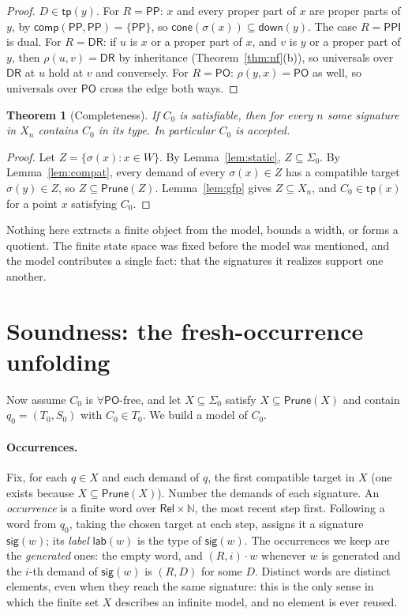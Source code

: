 \documentclass[11pt]{article}
\newcommand{\DR}{\mathsf{DR}}
\newcommand{\PO}{\mathsf{PO}}
\newcommand{\PP}{\mathsf{PP}}
\newcommand{\PPI}{\mathsf{PPI}}
\newcommand{\Rel}{\mathsf{Rel}}
\newcommand{\comp}{\mathsf{comp}}
\newcommand{\tp}{\mathsf{tp}}
\newcommand{\dn}{\mathsf{down}}
\newcommand{\cone}{\mathsf{cone}}
\newcommand{\Prune}{\mathsf{Prune}}
\newcommand{\lab}{\mathsf{lab}}
\newcommand{\sig}{\mathsf{sig}}
\newcommand{\nat}{\mathbb{N}}
\theoremstyle{plain}
\newtheorem{theorem}{Theorem}[section]
\theoremstyle{definition}
\begin{document}
\begin{proof}
$D\in\tp(y)$. For $R=\PP$: $x$ and every proper part of $x$ are proper parts of
$y$, by $\comp(\PP,\PP)=\{\PP\}$, so $\cone(\sigma(x))\subseteq\dn(y)$. The case
$R=\PPI$ is dual. For $R=\DR$: if $u$ is $x$ or a proper part of $x$, and $v$
is $y$ or a proper part of $y$, then $\rho(u,v)=\DR$ by inheritance
(Theorem~\ref{thm:nf}(b)), so universals over $\DR$ at $u$ hold at $v$ and
conversely. For $R=\PO$: $\rho(y,x)=\PO$ as well, so universals over $\PO$
cross the edge both ways.
\end{proof}

\begin{theorem}[Completeness]\label{thm:complete}
If $C_0$ is satisfiable, then for every $n$ some signature in $X_n$ contains
$C_0$ in its type. In particular $C_0$ is accepted.
\end{theorem}

\begin{proof}
Let $Z=\{\sigma(x):x\in W\}$. By Lemma~\ref{lem:static}, $Z\subseteq\Sigma_0$. By
Lemma~\ref{lem:compat}, every demand of every $\sigma(x)\in Z$ has a compatible
target $\sigma(y)\in Z$, so $Z\subseteq\Prune(Z)$. Lemma~\ref{lem:gfp} gives
$Z\subseteq X_n$, and $C_0\in\tp(x)$ for a point $x$ satisfying $C_0$.
\end{proof}

Nothing here extracts a finite object from the model, bounds a width, or forms a
quotient. The finite state space was fixed before the model was mentioned, and
the model contributes a single fact: that the signatures it realizes support
one another.

\section{Soundness: the fresh-occurrence unfolding}
\label{sec:soundness}

Now assume $C_0$ is $\forall\PO$-free, and let $X\subseteq\Sigma_0$ satisfy
$X\subseteq\Prune(X)$ and contain $q_0=(T_0,S_0)$ with $C_0\in T_0$. We build a
model of $C_0$.

\paragraph{Occurrences.} Fix, for each $q\in X$ and each demand of $q$, the first
compatible target in $X$ (one exists because $X\subseteq\Prune(X)$). Number the
demands of each signature. An \emph{occurrence} is a finite word over
$\Rel\times\nat$, the most recent step first. Following a word from $q_0$, taking
the chosen target at each step, assigns it a signature $\sig(w)$; its
\emph{label} $\lab(w)$ is the type of $\sig(w)$. The occurrences we keep are the
\emph{generated} ones: the empty word, and $(R,i)\cdot w$ whenever $w$ is
generated and the $i$-th demand of $\sig(w)$ is $(R,D)$ for some $D$. Distinct
words are distinct elements, even when they reach the same signature: this is
the only sense in which the finite set $X$ describes an infinite model, and
no element is ever reused.
\end{document}
